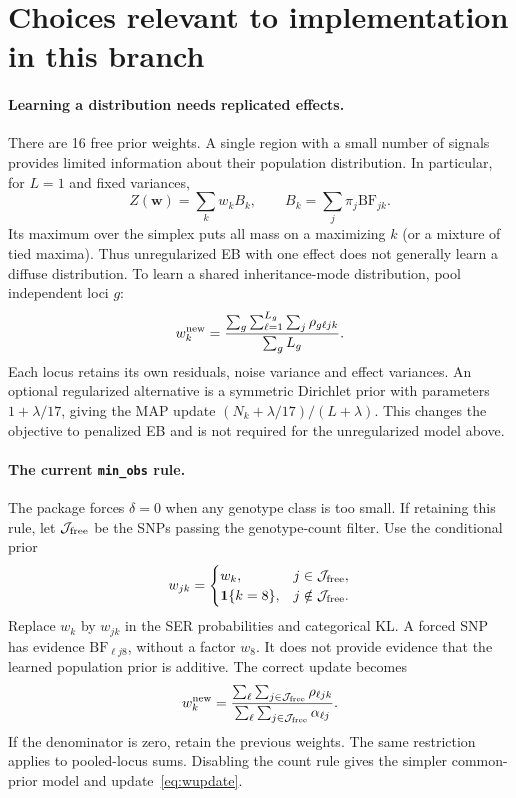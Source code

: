 \documentclass[11pt]{article}
\newcommand{\BF}{\mathrm{BF}}
\newcommand{\ind}{\mathbf 1}
\begin{document}
\newpage
\section{Choices relevant to implementation in this branch}
\paragraph{Learning a distribution needs replicated effects.}
There are 16 free prior weights. A single region with a small number of
signals provides limited information about their population distribution.
In particular, for $L=1$ and fixed variances,
\begin{equation}
 Z(\mathbf w)=\sum_k w_k B_k,\qquad B_k=\sum_j\pi_j\BF_{jk}.
\end{equation}
Its maximum over the simplex puts all mass on a maximizing $k$
(or a mixture of tied maxima). Thus unregularized EB with one effect
does not generally learn a diffuse distribution. To learn a shared
inheritance-mode distribution, pool independent loci $g$:
\begin{equation}
 w_k^{\rm new}=
 \frac{\sum_g\sum_{\ell=1}^{L_g}\sum_j\rho_{g\ell jk}}
      {\sum_g L_g}.
 \label{eq:pooled}
\end{equation}
Each locus retains its own residuals, noise variance and effect variances.
An optional regularized alternative is a symmetric Dirichlet prior
with parameters $1+\lambda/17$, giving the MAP update
$(N_k+\lambda/17)/(L+\lambda)$. This changes the objective to
penalized EB and is not required for the unregularized model above.

\paragraph{The current \texttt{min\_obs} rule.}
The package forces $\delta=0$ when any genotype class is too small.
If retaining this rule, let $\mathcal J_{\rm free}$ be the SNPs passing
the genotype-count filter. Use the conditional prior
\begin{equation}
 w_{jk}=\begin{cases}w_k,&j\in\mathcal J_{\rm free},\\
                       \ind\{k=8\},&j\notin\mathcal J_{\rm free}.
          \end{cases}
 \label{eq:forced-prior}
\end{equation}
Replace $w_k$ by $w_{jk}$ in the SER probabilities and categorical KL.
A forced SNP has evidence $\BF_{\ell j8}$, without a factor $w_8$.
It does not provide evidence that the learned population prior is
additive. The correct update becomes
\begin{equation}
 w_k^{\rm new}=
 \frac{\sum_\ell\sum_{j\in\mathcal J_{\rm free}}\rho_{\ell jk}}
      {\sum_\ell\sum_{j\in\mathcal J_{\rm free}}\alpha_{\ell j}}.
 \label{eq:forced-update}
\end{equation}
If the denominator is zero, retain the previous weights. The same
restriction applies to pooled-locus sums. Disabling the count rule
gives the simpler common-prior model and update~\eqref{eq:wupdate}.
\end{document}
